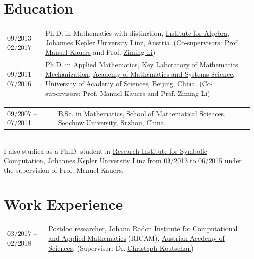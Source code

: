 \documentclass[a4paper,12pt]{article}
\begin{document}
\section*{\Large{Education}}

\vspace{.05in}
\begin{tabular}{@{}p{1.4in}p{4in}}
09/2013 -- 02/2017    & Ph.D. in Mathematics with distinction, 
                        \href{http://www.jku.at/algebra/content}{Institute for Algebra}, 
                        \href{http://www.jku.at/content}{Johannes Kepler University Linz}, Austria. 
                        (Co-supervisors: Prof. \href{http://www.kauers.de/}{Manuel Kauers} and 
                        Prof. \href{http://mmrc.iss.ac.cn/~zmli/}{Ziming Li})\\
09/2011 -- 07/2016    & Ph.D. in Applied Mathematics, 
                        \href{http://english.mmrc.amss.cas.cn/}{Key Laboratory of Mathematics Mechanization}, 
                        \href{http://english.amss.cas.cn/}{Academy of Mathematics and Systems Science}, 
                        \href{http://english.ucas.ac.cn/}{University of Academy of Sciences}, Beijing, China. 
                        (Co-supervisors: Prof. Manuel Kauers and Prof. Ziming Li)\\
\end{tabular}
\begin{tabular}{@{}p{1.4in}p{4in}}
09/2007 -- 07/2011    & B.Sc. in Mathematics, \href{http://math.suda.edu.cn/}{School of Mathematical Sciences}, 
                        \href{http://eng.suda.edu.cn/}{Soochow University}, Suzhou, China.  
\end{tabular} \\

\noindent I also studied as a Ph.D. student in \href{http://www.risc.jku.at/}{Research Institute for Symbolic Computation}, Johannes Kepler University Linz 
from 09/2013 to 06/2015 under the supervision of Prof. Manuel Kauers. 


\section*{\Large{Work Experience}}

\vspace{.05in}
\begin{tabular}{@{}p{1.4in}p{4in}}
03/2017 -- 02/2018    & Postdoc researcher, 
                        \href{https://www.ricam.oeaw.ac.at/}{Johann Radon Institute for Computational and Applied Mathematics} (RICAM),
                        \href{http://www.oeaw.ac.at/en/austrian-academy-of-sciences/}{Austrian Acedemy of Sciences}. 
                        (Supervisor: Dr. \href{http://www.koutschan.de/}{Christoph Koutschan})\\
\end{tabular}
\end{document}
